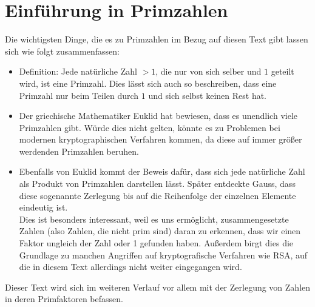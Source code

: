 	
	\section{Einf\"uhrung in Primzahlen} 
	\label{sec:primzahlen}
	Die wichtigsten Dinge, die es zu Primzahlen im Bezug auf diesen Text gibt lassen sich wie folgt zusammenfassen:

	\begin{itemize}
		\item Definition: Jede nat\"urliche Zahl $>1$, die nur von sich selber und  $1$ geteilt wird, ist eine Primzahl. Dies l\"asst sich auch so beschreiben, dass eine Primzahl nur beim Teilen durch $1$ und sich selbst keinen Rest hat.
		
		\item Der griechische Mathematiker Euklid hat bewiesen, dass es unendlich viele Primzahlen gibt. W\"urde dies nicht gelten, k\"onnte es zu Problemen bei modernen kryptographischen Verfahren kommen, da diese auf immer gr\"o\ss er werdenden Primzahlen beruhen. 
		
		\item  Ebenfalls von Euklid kommt der Beweis daf\"ur, dass sich jede nat\"urliche Zahl als Produkt von Primzahlen darstellen l\"asst. Sp\"ater entdeckte Gauss, dass diese sogenannte Zerlegung bis auf die Reihenfolge der einzelnen Elemente eindeutig ist. \\
		Dies ist besonders interessant, weil es uns erm\"oglicht, zusammengesetzte Zahlen (also Zahlen, die nicht prim sind) daran zu erkennen, dass wir einen Faktor ungleich der Zahl oder 1 gefunden haben. Au\ss erdem birgt dies die Grundlage zu manchen Angriffen auf kryptografische Verfahren wie RSA, auf die in diesem Text allerdings nicht weiter eingegangen wird.
	\end{itemize}
	
	\noindent Dieser Text wird sich im weiteren Verlauf vor allem mit der Zerlegung von Zahlen in deren Primfaktoren befassen. 